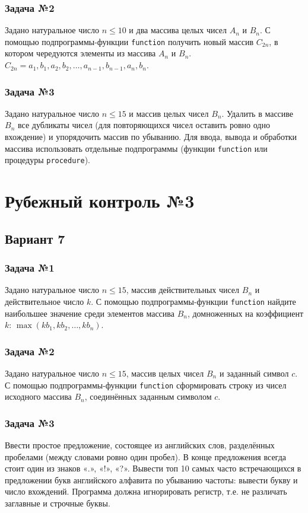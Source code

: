 \documentclass[12pt,a5paper,landscape]{report}
\begin{document}
\subsubsection*{Задача №2}
Задано натуральное число $n \le 10$ и два массива целых чисел $A_n$ и $B_n$. С помощью подпрограммы-функции \texttt{function} получить новый массив $C_{2n}$, в котором чередуются элементы из массива $A_n$ и $B_n$. $C_{2n} = a_1, b_1, a_2, b_2, \ldots, a_{n-1}, b_{n-1}, a_n, b_n$.  
\subsubsection*{Задача №3}
Задано натуральное число $n \le 15$ и массив целых чисел $B_n$. Удалить в массиве $B_n$ все дубликаты чисел (для повторяющихся чисел оставить ровно одно вхождение) и упорядочить массив по убыванию. Для ввода, вывода и обработки массива использовать отдельные подпрограммы (функции \texttt{function} или процедуры \texttt{procedure}).


\section*{Рубежный контроль №3}
\subsection*{Вариант 7}
\subsubsection*{Задача №1}
Задано натуральное число $n \le 15$, массив действительных чисел $B_n$ и действительное число $k$. С помощью подпрограммы-функции \texttt{function} найдите наибольшее значение среди элементов массива $B_n$, домноженных на коэффициент $k$: $\max({k b_1, k b_2, \ldots, k b_n})$.
\subsubsection*{Задача №2}
Задано натуральное число $n \le 15$, массив целых чисел $B_n$ и заданный символ $c$. С помощью подпрограммы-функции \texttt{function} сформировать строку из чисел исходного массива $B_n$, соединённых заданным символом $c$.
\subsubsection*{Задача №3}
Ввести простое предложение, состоящее из английских слов, разделённых пробелами (между словами ровно один пробел). В конце предложения всегда стоит один из знаков «.», «!», «?». Вывести топ 10 самых часто встречающихся в предложении букв английского алфавита по убыванию частоты: вывести букву и число вхождений. Программа должна игнорировать регистр, т.е. не различать заглавные и строчные буквы.
\end{document}
